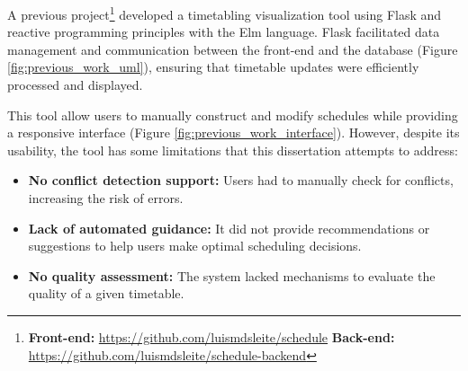 A previous project\footnote{\textbf{Front-end:} \url{https://github.com/luismdsleite/schedule} \textbf{Back-end:} \url{https://github.com/luismdsleite/schedule-backend}} developed a timetabling visualization tool using Flask and reactive programming principles with the Elm language. Flask facilitated data management and communication between the front-end and the database (Figure \ref{fig:previous_work_uml}), ensuring that timetable updates were efficiently processed and displayed. 

This tool allow users to manually construct and modify schedules while providing a responsive interface (Figure \ref{fig:previous_work_interface}). However, despite its usability, the tool has some limitations that this dissertation attempts to address:

\begin{itemize}
\item \textbf{No conflict detection support:} Users had to manually check for conflicts, increasing the risk of errors.
\item \textbf{Lack of automated guidance:} It did not provide recommendations or suggestions to help users make optimal scheduling decisions.
\item \textbf{No quality assessment:} The system lacked mechanisms to evaluate the quality of a given timetable.
\end{itemize}




